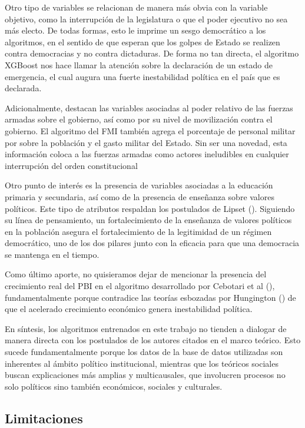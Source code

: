 \documentclass{article}
\begin{document}
Otro tipo de variables se relacionan de manera más obvia con la variable objetivo, como la interrupción de
la legislatura o que el poder ejecutivo no sea más electo. De todas formas, esto le imprime un sesgo
democrático a los algoritmos, en el sentido de que esperan que los golpes de Estado se 
realizen contra democracias y no contra dictaduras. De forma no tan directa, el algoritmo XGBoost nos hace
llamar la atención sobre la declaración de un estado de emergencia, el cual augura una fuerte
inestabilidad política en el país que es declarada.

Adicionalmente, destacan las variables asociadas al poder relativo de las fuerzas armadas sobre el gobierno,
así como por su nivel de movilización contra el gobierno. El algoritmo del FMI también agrega el porcentaje
de personal militar por sobre la población y el gasto militar del Estado. Sin ser una novedad, esta 
información coloca a las fuerzas armadas como actores ineludibles en cualquier interrupción del orden 
constitucional

Otro punto de interés es la presencia de variables asociadas a la educación primaria y secundaria, así como
de la presencia de enseñanza sobre valores políticos. Este tipo de atributos respaldan los postulados de
Lipset (\citeyear{lipset1959some}). Siguiendo su línea de pensamiento, un fortalecimiento de la enseñanza
de valores políticos en la población asegura el fortalecimiento de la legitimidad de un régimen democrático,
uno de los dos pilares junto con la eficacia para que una democracia se mantenga en el tiempo.

Como último aporte, no quisieramos dejar de mencionar la presencia del crecimiento real del PBI en el
algoritmo desarrollado por Cebotari et al (\citeyear{Ceb24}), fundamentalmente porque contradice las teorías
esbozadas por Hungington (\citeyear{huntington68political}) de
que el acelerado crecimiento económico genera inestabilidad política.

En síntesis, los algoritmos entrenados en este trabajo no tienden a dialogar de manera directa con los
postulados de los autores citados en el marco teórico. Esto sucede fundamentalmente porque los datos de
la base de datos utilizadas son inherentes al ámbito político institucional, mientras que los teóricos
sociales buscan explicaciones más amplias y multicausales, que involucren procesos no solo políticos sino
también económicos, sociales y culturales.

\subsection{Limitaciones}
\end{document}
